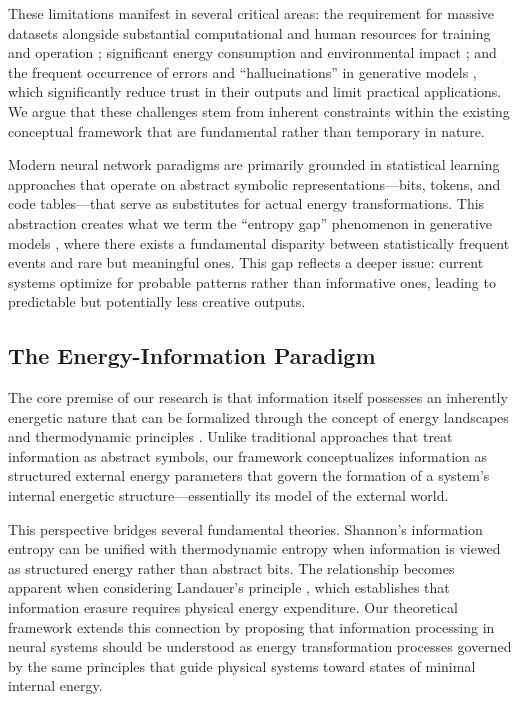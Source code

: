 \documentclass[12pt, a4paper]{article}
\begin{document}
These limitations manifest in several critical areas: the requirement for massive datasets alongside substantial computational and human resources for training and operation \cite{strubell2019, thompson2020}; significant energy consumption and environmental impact \cite{patterson2021}; and the frequent occurrence of errors and ``hallucinations'' in generative models \cite{ji2023, huang2023}, which significantly reduce trust in their outputs and limit practical applications. We argue that these challenges stem from inherent constraints within the existing conceptual framework that are fundamental rather than temporary in nature.

Modern neural network paradigms are primarily grounded in statistical learning approaches that operate on abstract symbolic representations—bits, tokens, and code tables—that serve as substitutes for actual energy transformations. This abstraction creates what we term the ``entropy gap'' phenomenon in generative models \cite{shumailov2023, alemohammad2023}, where there exists a fundamental disparity between statistically frequent events and rare but meaningful ones. This gap reflects a deeper issue: current systems optimize for probable patterns rather than informative ones, leading to predictable but potentially less creative outputs.

\subsection*{The Energy-Information Paradigm}

The core premise of our research is that information itself possesses an inherently energetic nature that can be formalized through the concept of energy landscapes and thermodynamic principles \cite{hopfield1982}. Unlike traditional approaches that treat information as abstract symbols, our framework conceptualizes information as structured external energy parameters that govern the formation of a system's internal energetic structure—essentially its model of the external world.

This perspective bridges several fundamental theories. Shannon's information entropy can be unified with thermodynamic entropy when information is viewed as structured energy rather than abstract bits. The relationship becomes apparent when considering Landauer's principle \cite{landauer1961}, which establishes that information erasure requires physical energy expenditure. Our theoretical framework extends this connection by proposing that information processing in neural systems should be understood as energy transformation processes governed by the same principles that guide physical systems toward states of minimal internal energy.
\end{document}
